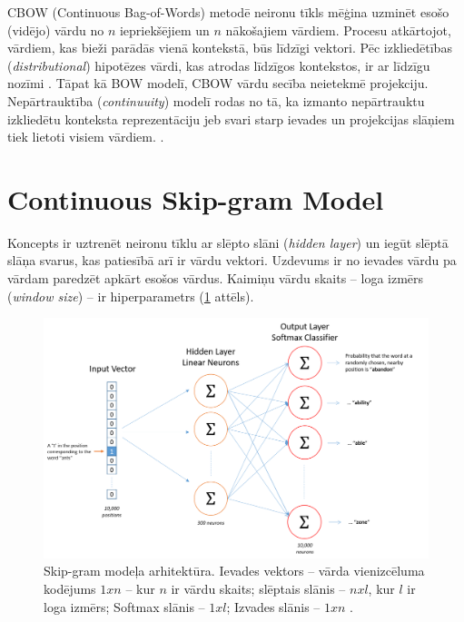 CBOW (Continuous Bag-of-Words) metodē neironu tīkls mēģina uzminēt esošo (vidējo) vārdu no $n$ iepriekšējiem un $n$ nākošajiem vārdiem. Procesu atkārtojot, vārdiem, kas bieži parādās vienā kontekstā, būs līdzīgi vektori. Pēc izkliedētības (\textit{distributional}) hipotēzes vārdi, kas atrodas līdzīgos kontekstos, ir ar līdzīgu nozīmi \cite{word2vec2013}. Tāpat kā BOW modelī, CBOW vārdu secība neietekmē projekciju. Nepārtrauktība (\textit{continuuity}) modelī rodas no tā, ka izmanto nepārtrauktu izkliedētu konteksta reprezentāciju
jeb svari starp ievades un projekcijas slāņiem tiek lietoti visiem vārdiem.
\cite{word2vec2013}.

\section{Continuous Skip-gram Model}


Koncepts ir uztrenēt neironu tīklu ar slēpto slāni (\textit{hidden layer}) un iegūt slēptā slāņa svarus, kas patiesībā arī ir vārdu vektori. Uzdevums ir no ievades vārdu pa vārdam paredzēt apkārt esošos vārdus. Kaimiņu vārdu skaits -- loga izmērs (\textit{window size}) -- ir hiperparametrs (\ref{fig:skipgram} attēls).


\begin{figure}[h]
	\centering
	\includegraphics[width=\textwidth]{figures/skip_gram_net_arch.png}
	\caption{Skip-gram modeļa arhitektūra.
	Ievades vektors -- vārda vienizcēluma kodējums $1xn$ -- kur $n$ ir vārdu skaits; 
	slēptais slānis --  $nxl$, kur $l$ ir loga izmērs;
	Softmax slānis -- $1xl$;
	Izvades slānis -- $1xn$ \cite{mccormick2016}.}
	\label{fig:skipgram}
\end{figure}

